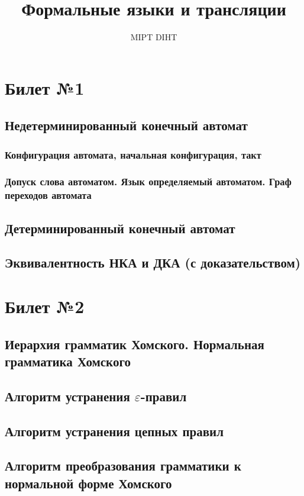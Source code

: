 \documentclass[a4paper]{article}
\title{Формальные языки и трансляции}
\author{MIPT DIHT}
\begin{document}
\maketitle

\section{Билет №1}
\subsection{Недетерминированный конечный автомат}
\subsubsection{Конфигурация автомата, начальная конфигурация, такт}
\subsubsection{Допуск слова автоматом. Язык определяемый автоматом. Граф переходов автомата}
\subsection{Детерминированный конечный автомат}
\subsection{Эквивалентность НКА и ДКА (с доказательством)}

\section{Билет №2}
\subsection{Иерархия грамматик Хомского. Нормальная грамматика Хомского}
\subsection{Алгоритм устранения $\varepsilon$-правил}
\subsection{Алгоритм устранения цепных правил}
\subsection{Алгоритм преобразования грамматики к нормальной форме Хомского}
\end{document}
